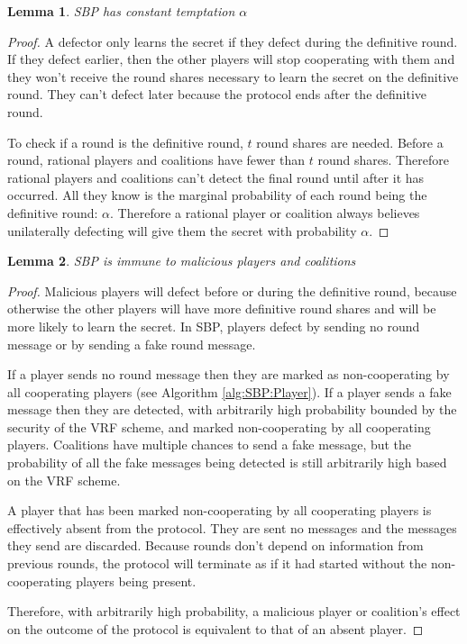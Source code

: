 \documentclass{dalcsthesis}
\newtheorem{lemma}{Lemma}
\begin{document}
\begin{lemma} SBP has constant temptation $\alpha$ \label{Lem:SBPConstTempt} \end{lemma}
\begin{proof}
A defector only learns the secret if they defect during the definitive round. If they defect earlier, then the other players will stop cooperating with them and they won't receive the round shares necessary to learn the secret on the definitive round. They can't defect later because the protocol ends after the definitive round. 

To check if a round is the definitive round, $t$ round shares are needed. Before a round, rational players and coalitions have fewer than $t$ round shares. Therefore rational players and coalitions can't detect the final round until after it has occurred. All they know is the marginal probability of each round being the definitive round: $\alpha$. Therefore a rational player or coalition always believes unilaterally defecting will give them the secret with probability $\alpha$.
\end{proof}

\begin{lemma} SBP is immune to malicious players and coalitions \label{Lem:SBPMalImmune} \end{lemma}
\begin{proof}
Malicious players will defect before or during the definitive round, because otherwise the other players will have more definitive round shares and will be more likely to learn the secret. In SBP, players defect by sending no round message or by sending a fake round message.

If a player sends no round message then they are marked as non-cooperating by all cooperating players (see Algorithm \ref{alg:SBP:Player}). If a player sends a fake message then they are detected, with arbitrarily high probability bounded by the security of the VRF scheme, and marked non-cooperating by all cooperating players. Coalitions have multiple chances to send a fake message, but the probability of all the fake messages being detected is still arbitrarily high based on the VRF scheme. 

A player that has been marked non-cooperating by all cooperating players is effectively absent from the protocol. They are sent no messages and the messages they send are discarded. Because rounds don't depend on information from previous rounds, the protocol will terminate as if it had started without the non-cooperating players being present.

Therefore, with arbitrarily high probability, a malicious player or coalition's effect on the outcome of the protocol is equivalent to that of an absent player.
\end{proof}
\end{document}
